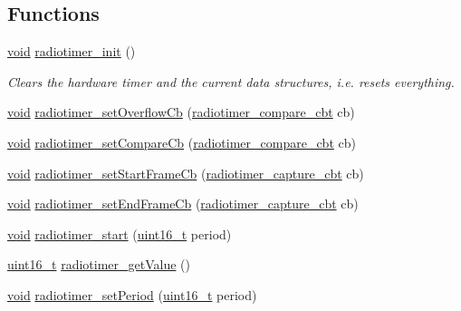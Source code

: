 \subsection*{Functions}
\begin{DoxyCompactItemize}
\item 
\hyperlink{usb__devapi_8h_afabf60e7f57651d6d595a02c75f07cd0}{void} \hyperlink{group__radiotimer_ga9a5ab332f81d5e2a74143ad62ef6a2f7}{radiotimer\+\_\+init} ()
\begin{DoxyCompactList}\small\item\em Clears the hardware timer and the current data structures, i.\+e. resets everything. \end{DoxyCompactList}\item 
\hyperlink{usb__devapi_8h_afabf60e7f57651d6d595a02c75f07cd0}{void} \hyperlink{group__radiotimer_gab892e556a83f22551ff4e4551bd488f7}{radiotimer\+\_\+set\+Overflow\+Cb} (\hyperlink{group__radiotimer_ga62b602325e65023c91b784f20cd2d6bc}{radiotimer\+\_\+compare\+\_\+cbt} cb)
\item 
\hyperlink{usb__devapi_8h_afabf60e7f57651d6d595a02c75f07cd0}{void} \hyperlink{group__radiotimer_gaf4d7c5df5b6c28462c5104df496ae584}{radiotimer\+\_\+set\+Compare\+Cb} (\hyperlink{group__radiotimer_ga62b602325e65023c91b784f20cd2d6bc}{radiotimer\+\_\+compare\+\_\+cbt} cb)
\item 
\hyperlink{usb__devapi_8h_afabf60e7f57651d6d595a02c75f07cd0}{void} \hyperlink{group__radiotimer_gad6bae4a356aa6856a48dd247eea43f84}{radiotimer\+\_\+set\+Start\+Frame\+Cb} (\hyperlink{group__radiotimer_gac7da641d0774aa21bfabefd560e42acf}{radiotimer\+\_\+capture\+\_\+cbt} cb)
\item 
\hyperlink{usb__devapi_8h_afabf60e7f57651d6d595a02c75f07cd0}{void} \hyperlink{group__radiotimer_ga54531cf0f173f07f760d24aeacbc6fe3}{radiotimer\+\_\+set\+End\+Frame\+Cb} (\hyperlink{group__radiotimer_gac7da641d0774aa21bfabefd560e42acf}{radiotimer\+\_\+capture\+\_\+cbt} cb)
\item 
\hyperlink{usb__devapi_8h_afabf60e7f57651d6d595a02c75f07cd0}{void} \hyperlink{iot-lab___a8-_m3_2radiotimer_8c_a3dda7b06fc7986db2f835ad5399be228}{radiotimer\+\_\+start} (\hyperlink{_p_e___types_8h_a1f1825b69244eb3ad2c7165ddc99c956}{uint16\+\_\+t} period)
\item 
\hyperlink{_p_e___types_8h_a1f1825b69244eb3ad2c7165ddc99c956}{uint16\+\_\+t} \hyperlink{group__radiotimer_ga763b0da72c3bbf926f5a74283de1003c}{radiotimer\+\_\+get\+Value} ()
\item 
\hyperlink{usb__devapi_8h_afabf60e7f57651d6d595a02c75f07cd0}{void} \hyperlink{iot-lab___a8-_m3_2radiotimer_8c_a3e0cb6aae48e0b636c661446f83242d9}{radiotimer\+\_\+set\+Period} (\hyperlink{_p_e___types_8h_a1f1825b69244eb3ad2c7165ddc99c956}{uint16\+\_\+t} period)

\end{DoxyCompactItemize}
